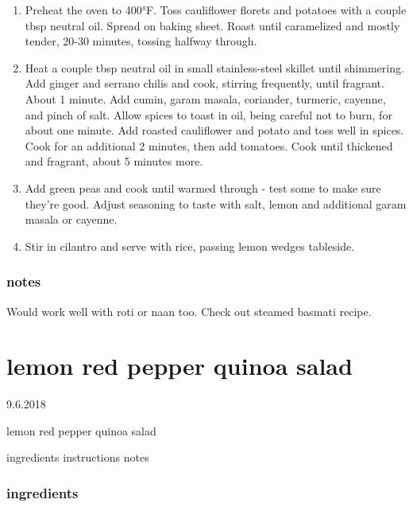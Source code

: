 \documentclass[]{book}
\providecommand{\tightlist}{%
  \setlength{\itemsep}{0pt}\setlength{\parskip}{0pt}}
\begin{document}
\begin{enumerate}
\def\labelenumi{\arabic{enumi}.}
\tightlist
\item
  Preheat the oven to 400°F. Toss cauliflower florets and potatoes with a couple tbsp neutral oil. Spread on baking sheet.
  Roast until caramelized and mostly tender, 20-30 minutes, tossing halfway through.
\item
  Heat a couple tbsp neutral oil in small stainless-steel skillet until shimmering. Add ginger and serrano chilis and
  cook, stirring frequently, until fragrant. About 1 minute. Add cumin, garam masala, coriander, turmeric, cayenne, and
  pinch of salt. Allow spices to toast in oil, being careful not to burn, for about one minute. Add
  roasted cauliflower and potato and toss well in spices. Cook for an additional 2 minutes, then add tomatoes. Cook until
  thickened and fragrant, about 5 minutes more.
\item
  Add green peas and cook until warmed through - test some to make sure they're good.
  Adjust seasoning to taste with salt, lemon and additional garam masala or cayenne.
\item
  Stir in cilantro and serve with rice, passing lemon wedges tableside.
\end{enumerate}

\hypertarget{notes}{%
\subsection{notes}\label{notes}}

Would work well with roti or naan too. Check out steamed basmati recipe.

\hypertarget{lemon-red-pepper-quinoa-salad}{%
\chapter{lemon red pepper quinoa salad}\label{lemon-red-pepper-quinoa-salad}}

9.6.2018

lemon red pepper quinoa salad

ingredients \textbar{}
instructions \textbar{}
notes

\hypertarget{ingredients-1}{%
\subsection{ingredients}\label{ingredients-1}}
\end{document}
